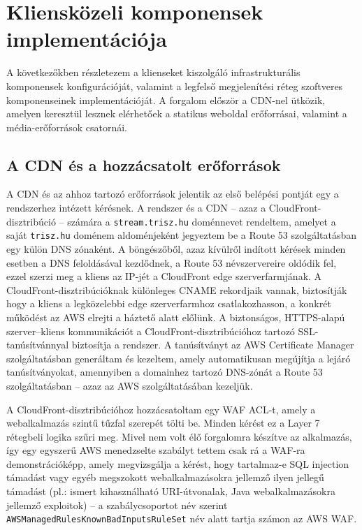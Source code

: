 \chapter{Kliensközeli komponensek implementációja}

A következőkben részletezem a klienseket kiszolgáló infrastrukturális komponensek konfigurációját, valamint a legfelső megjelenítési réteg szoftveres komponenseinek implementációját. A forgalom először a CDN-nel ütközik, amelyen keresztül lesznek elérhetőek a statikus weboldal erőforrásai, valamint a média-erőforrások csatornái.

\section{A CDN és a hozzácsatolt erőforrások}

A CDN és az ahhoz tartozó erőforrások jelentik az első belépési pontját egy a rendszerhez intézett kérésnek. A rendszer és a CDN -- azaz a CloudFront-disztribúció -- számára a \verb|stream.trisz.hu| doménnevet rendeltem, amelyet a saját \verb|trisz.hu| doménem aldoménjeként jegyeztem be a Route 53 szolgáltatásban egy külön DNS zónaként. A böngészőből, azaz kívülről indított kérések minden esetben a DNS feloldásával kezdődnek, a Route 53 névszervereire oldódik fel, ezzel szerzi meg a kliens az IP-jét a CloudFront edge szerverfarmjának. A CloudFront-disztribúcióknak különleges CNAME rekordjaik vannak, biztosítják hogy a kliens a legközelebbi edge szerverfarmhoz csatlakozhasson, a konkrét működést az AWS elrejti a háztető alatt előlünk. A biztonságos, HTTPS-alapú szerver--kliens kommunikációt a CloudFront-disztribúcióhoz tartozó SSL-tanúsítvánnyal biztosítja a rendszer. A tanúsítványt az AWS Certificate Manager szolgáltatásban generáltam és kezeltem, amely automatikusan megújítja a lejáró tanúsítványokat, amennyiben a domainhez tartozó DNS-zónát a Route 53 szolgáltatásban -- azaz az AWS szolgáltatásában kezeljük.

A CloudFront-disztribúcióhoz hozzácsatoltam egy WAF ACL-t, amely a webalkalmazás szintű tűzfal szerepét tölti be. Minden kérést ez a Layer 7 rétegbeli logika szűri meg. Mivel nem volt élő forgalomra készítve az alkalmazás, így egy egyszerű AWS menedzselte szabályt tettem csak rá a WAF-ra demonstrációképp, amely megvizsgálja a kérést, hogy tartalmaz-e SQL injection támadást vagy egyéb megszokott webalkalmazásokra jellemző ilyen jellegű támadást (pl.: ismert kihasználható URI-útvonalak, Java webalkalmazásokra jellemző exploitok) -- a szabálycsoportot név szerint \verb|AWSManagedRulesKnownBadInputsRuleSet| név alatt tartja számon az AWS WAF.

